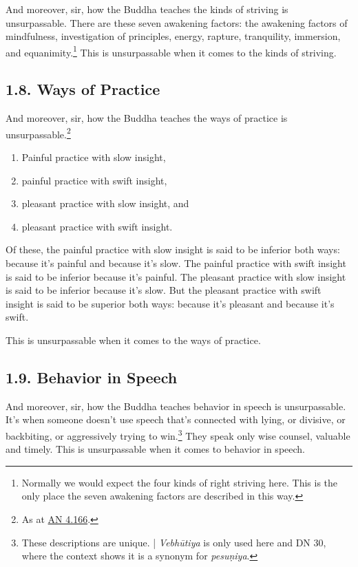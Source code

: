 \documentclass[12pt,openany]{book}%
\begin{document}
And moreover, sir, how the Buddha teaches the kinds of striving is unsurpassable. There are these seven awakening factors: the awakening factors of mindfulness, investigation of principles, energy, rapture, tranquility, immersion, and equanimity.\footnote{Normally we would expect the four kinds of right striving here. This is the only place the seven awakening factors are described in this way. } This is unsurpassable when it comes to the kinds of striving. 

\subsection*{1.8. Ways of Practice }

And moreover, sir, how the Buddha teaches the ways of practice is unsurpassable.\footnote{As at \href{https://suttacentral.net/an4.166/en/sujato}{AN 4.166}. } 

\begin{enumerate}%
\item Painful practice with slow insight, %
\item painful practice with swift insight, %
\item pleasant practice with slow insight, and %
\item pleasant practice with swift insight. %
\end{enumerate}

Of these, the painful practice with slow insight is said to be inferior both ways: because it’s painful and because it’s slow. The painful practice with swift insight is said to be inferior because it’s painful. The pleasant practice with slow insight is said to be inferior because it’s slow. But the pleasant practice with swift insight is said to be superior both ways: because it’s pleasant and because it’s swift. 

This is unsurpassable when it comes to the ways of practice. 

\subsection*{1.9. Behavior in Speech }

And moreover, sir, how the Buddha teaches behavior in speech is unsurpassable. It’s when someone doesn’t use speech that’s connected with lying, or divisive, or backbiting, or aggressively trying to win.\footnote{These descriptions are unique. | \textit{\textsanskrit{Vebhūtiya}} is only used here and DN 30, where the context shows it is a synonym for \textit{\textsanskrit{pesuṇiya}}. } They speak only wise counsel, valuable and timely. This is unsurpassable when it comes to behavior in speech. 
\end{document}
